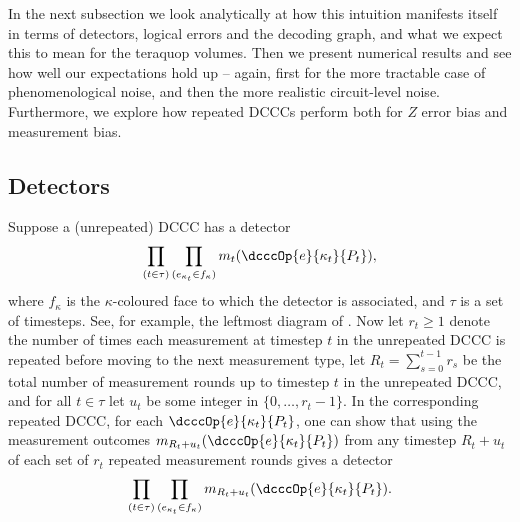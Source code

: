 In the next subsection we look analytically at how this intuition manifests itself in terms of detectors, logical errors and the decoding graph, and what we expect this to mean for the teraquop volumes.
Then we present numerical results and see how well our expectations hold up -- again, first for the more tractable case of phenomenological noise, and then the more realistic circuit-level noise.
Furthermore, we explore how repeated DCCCs perform both for $Z$ error bias and measurement bias.

\subsection{Detectors}\label{subsec:repeating_measurements_detectors}

Suppose a (unrepeated) DCCC has a detector
\begin{equation}\label{eq:unrepeated_detector}
\prod_{(t \in \tau)}
\prod_{(e_{\kappa_t} \in f_{\kappa})}
m_t(\dcccOp{e}{\kappa_t}{P_t}),
\end{equation}
where $f_\kappa$ is the $\kappa$-coloured face to which the detector is associated,
and $\tau$ is a set of timesteps.
See, for example, the leftmost diagram of .
Now let $r_t \geq 1$ denote the number of times each measurement at timestep $t$ in the unrepeated DCCC is repeated before moving to the next measurement type,
let $R_t = \sum_{s=0}^{t-1} r_s$ be the total number of measurement rounds up to timestep $t$ in the unrepeated DCCC,
and for all $t \in \tau$ let $u_t$ be some integer in $\{0, \ldots, r_t-1\}$.
In the corresponding repeated DCCC, for each $\dcccOp{e}{\kappa_t}{P_t}$,
one can show that using the measurement outcomes $m_{R_t + u_t}(\dcccOp{e}{\kappa_{t}}{P_{t}})$ from
any timestep $R_t + u_t$ of each set of $r_t$ repeated measurement rounds gives a detector
\begin{equation}\label{eq:repeated_detector_using_first_round_measurements}
\prod_{(t \in \tau)}
\prod_{(e_{\kappa_{t}} \in f_{\kappa})}
m_{R_t + u_t}(\dcccOp{e}{\kappa_{t}}{P_{t}}).
\end{equation}

